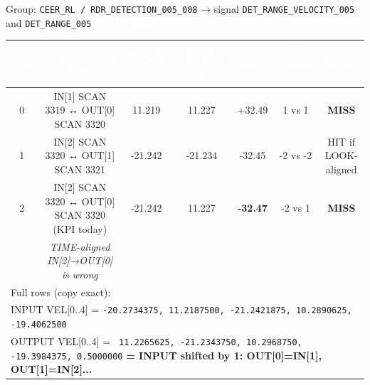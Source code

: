 \documentclass[11pt,a4paper]{article}
\newcommand{\badge}[2]{\colorbox{#1}{\textcolor{white}{\scriptsize\textbf{#2}}}}
\newcommand{\warnbadge}{\badge{warn}{SHIFTED 1 scan}}
\newcommand{\tblhead}[1]{\rowcolor{tableHeader}\textcolor{white}{\textbf{#1}}}
\begin{document}
\begin{tcolorbox}[colback=white,colframe=navy,arc=2mm,boxsep=2mm,title=\textbf{DUMP 2 — Detection payload is shifted by 1 scan (exact samples, RL is velocity-sensitive)}]
\scriptsize
\textcolor{midGray}{Group: \texttt{CEER\_RL / RDR\_DETECTION\_005\_008} → signal \texttt{DET\_RANGE\_VELOCITY\_005} and \texttt{DET\_RANGE\_005}} \hfill \warnbadge
\vspace{1mm}

\begin{tabular}{@{}c@{\;}c@{\;}c@{\;}c@{\;}c@{\;}c@{\;}c@{}}
\tblhead{Row} & \tblhead{SCAN-aligned pair} & \tblhead{INPUT VEL} & \tblhead{OUTPUT VEL} & \tblhead{Delta} & \tblhead{KPI bucket (÷10)} & \tblhead{Result}\\
\midrule
0 & IN[1] SCAN 3319 ↔ OUT[0] SCAN 3320 & 11.219 & \cellcolor{diffRed}11.227 & \cellcolor{diffRed}+32.49 & 1 vs 1 & \cellcolor{diffRed}\textcolor{bad}{\textbf{MISS}}\\
1 & IN[2] SCAN 3320 ↔ OUT[1] SCAN 3321 & -21.242 & -21.234 & -32.45 & -2 vs -2 & \cellcolor{diffGreen}\textcolor{good}{HIT if LOOK-aligned}\\
\rowcolor{lightGray} 2 & IN[2] SCAN 3320 ↔ OUT[0] SCAN 3320 (KPI today) & \cellcolor{diffRed}-21.242 & \cellcolor{diffRed}11.227 & \cellcolor{diffRed}\textbf{-32.47} & -2 vs 1 & \cellcolor{diffRed}\textcolor{bad}{\textbf{MISS}}\\
 & \textit{TIME-aligned IN[2]→OUT[0] is wrong} & & & & & \\
\midrule
\multicolumn{7}{l}{\textcolor{midGray}{Full rows (copy exact):}}\\
\multicolumn{7}{l}{INPUT  VEL[0..4] = \texttt{-20.2734375,  11.2187500, -21.2421875, 10.2890625, -19.4062500}}\\
\multicolumn{7}{l}{OUTPUT VEL[0..4] = \texttt{ 11.2265625, -21.2343750, 10.2968750, -19.3984375, 0.5000000}  \quad \textcolor{warn}{\textbf{= INPUT shifted by 1: OUT[0]=IN[1], OUT[1]=IN[2]...}}}\\
\end{tabular}
\vspace{2mm}


\end{tcolorbox}
\end{document}
